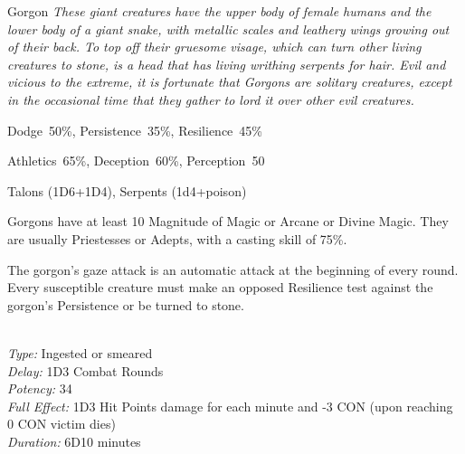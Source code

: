 \newpage

\begin{monsterbox}{Gorgon}
	\textit{These giant creatures have the upper body of female humans and the lower body of a giant snake, with metallic scales and leathery wings growing out of their back. To top off their gruesome visage, which can turn other living creatures to stone, is a head that has living writhing serpents for hair. Evil and vicious to the extreme, it is fortunate that Gorgons are solitary creatures, except in the occasional time that they gather to lord it over other evil creatures.}\\
	\rpghline
	\basics[%
        hitpoints  = 16,
	majorwound = 8,
	damagemodifier = +1D4,
	powerpoints = 16,
	movementrate = {15m, 23m when flying},
	armor = Tough Scales (8AP),
	plunderrating = 5
	]
	\rpghline%
	\stats[ %
		STR = 4D6    (14),
		CON = 3D6+6  (17),
		DEX = 3D6+6  (17),
		SIZ = 4D6    (14),
		INT = 3D6    (11),
		POW = 1D6+12 (16),
		CHA = 1D6    (4)
	]
	\rpghline%
	\begin{rpg-monsteraction}[Resistances]
		Dodge~50\%, Persistence~35\%, Resilience~45\%
	\end{rpg-monsteraction}
	\begin{rpg-monsteraction}[Practical]
		Athletics~65\%, Deception~60\%, Perception~50%
	\end{rpg-monsteraction}
	\begin{rpg-monsteraction}
		Talons (1D6+1D4), Serpents (1d4+poison)
	\end{rpg-monsteraction}
	\begin{rpg-monsteraction}[Magic]
		Gorgons have at least 10 Magnitude of Magic or Arcane or Divine Magic. They are usually Priestesses or Adepts, with a casting skill of 75\%.
	\end{rpg-monsteraction}
	\begin{rpg-monsteraction}
		The gorgon’s gaze attack is an automatic attack at the beginning of every round. Every susceptible creature must make an opposed Resilience test against the gorgon’s Persistence or be turned to stone.
	\end{rpg-monsteraction}
	\begin{rpg-monsteraction}\\
		\textit{Type:} Ingested or smeared\\
		\textit{Delay:} 1D3 Combat Rounds\\
		\textit{Potency:} 34\\
		\textit{Full Effect:} 1D3 Hit Points damage for each minute and -3 CON (upon reaching 0 CON victim dies)\\ 
		\textit{Duration:} 6D10 minutes
	\end{rpg-monsteraction}

\end{monsterbox}

